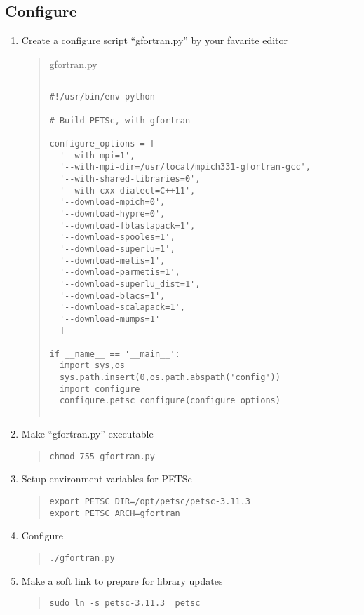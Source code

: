 \documentclass[11pt]{article}
\begin{document}
\subsection{Configure}
\begin{enumerate}
\item
Create a configure script ``gfortran.py'' by your favarite editor
\begin{quote}
gfortran.py
\hrule
\begin{verbatim}
#!/usr/bin/env python

# Build PETSc, with gfortran

configure_options = [
  '--with-mpi=1',
  '--with-mpi-dir=/usr/local/mpich331-gfortran-gcc',
  '--with-shared-libraries=0',
  '--with-cxx-dialect=C++11',
  '--download-mpich=0',
  '--download-hypre=0',
  '--download-fblaslapack=1',
  '--download-spooles=1',
  '--download-superlu=1',
  '--download-metis=1',
  '--download-parmetis=1',
  '--download-superlu_dist=1',
  '--download-blacs=1',
  '--download-scalapack=1',
  '--download-mumps=1'
  ]

if __name__ == '__main__':
  import sys,os
  sys.path.insert(0,os.path.abspath('config'))
  import configure
  configure.petsc_configure(configure_options)
\end{verbatim}
\hrule
\end{quote}
\item
Make ``gfortran.py'' executable
\begin{quote}
\begin{verbatim}
chmod 755 gfortran.py
\end{verbatim}
\end{quote}
\item
Setup environment variables for PETSc
\begin{quote}
\begin{verbatim}
export PETSC_DIR=/opt/petsc/petsc-3.11.3
export PETSC_ARCH=gfortran
\end{verbatim}
\end{quote}
\item
Configure
\begin{quote}
\begin{verbatim}
./gfortran.py
\end{verbatim}
\end{quote}
\item
Make a soft link to prepare for library updates
\begin{quote}
\begin{verbatim}
sudo ln -s petsc-3.11.3  petsc
\end{verbatim}
\end{quote}

\end{enumerate}
\end{document}
